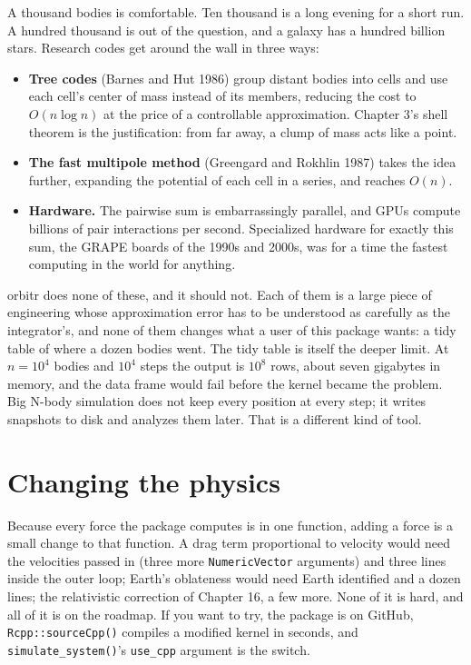 \documentclass[
  10.5pt,
  letterpaper,
]{scrbook}
\newcounter{none} %
\providecommand{\tightlist}{%
  \setlength{\itemsep}{0pt}\setlength{\parskip}{0pt}}
\theoremstyle{plain}
\theoremstyle{remark}
\begin{document}
A thousand bodies is comfortable. Ten thousand is a long evening for a
short run. A hundred thousand is out of the question, and a galaxy has a
hundred billion stars. Research codes get around the wall in three ways:

\begin{itemize}
\tightlist
\item
  \textbf{Tree codes} (Barnes and Hut 1986) group distant bodies into
  cells and use each cell's center of mass instead of its members,
  reducing the cost to \(O(n\log n)\) at the price of a controllable
  approximation. Chapter 3's shell theorem is the justification: from
  far away, a clump of mass acts like a point.
\item
  \textbf{The fast multipole method} (Greengard and Rokhlin 1987) takes
  the idea further, expanding the potential of each cell in a series,
  and reaches \(O(n)\).
\item
  \textbf{Hardware.} The pairwise sum is embarrassingly parallel, and
  GPUs compute billions of pair interactions per second. Specialized
  hardware for exactly this sum, the GRAPE boards of the 1990s and
  2000s, was for a time the fastest computing in the world for anything.
\end{itemize}

orbitr does none of these, and it should not. Each of them is a large
piece of engineering whose approximation error has to be understood as
carefully as the integrator's, and none of them changes what a user of
this package wants: a tidy table of where a dozen bodies went. The tidy
table is itself the deeper limit. At \(n = 10^4\) bodies and \(10^4\)
steps the output is \(10^8\) rows, about seven gigabytes in memory, and
the data frame would fail before the kernel became the problem. Big
N-body simulation does not keep every position at every step; it writes
snapshots to disk and analyzes them later. That is a different kind of
tool.

\section{Changing the physics}\label{changing-the-physics}

Because every force the package computes is in one function, adding a
force is a small change to that function. A drag term proportional to
velocity would need the velocities passed in (three more
\texttt{NumericVector} arguments) and three lines inside the outer loop;
Earth's oblateness would need Earth identified and a dozen lines; the
relativistic correction of Chapter 16, a few more. None of it is hard,
and all of it is on the roadmap. If you want to try, the package is on
GitHub, \texttt{Rcpp::sourceCpp()} compiles a modified kernel in
seconds, and \texttt{simulate\_system()}'s \texttt{use\_cpp} argument is
the switch.
\end{document}
